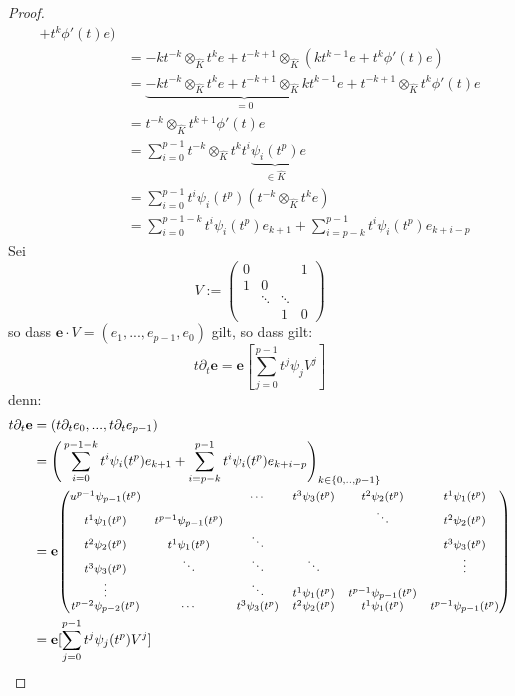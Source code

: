 \begin{proof}
\begin{align*}
    + t^k\phi'(t)e)\\
  &= -kt^{-k}\otimes_{\hat K}t^ke +
    t^{-k+1}\otimes_{\hat K}(kt^{k-1}e + t^k\phi'(t)e)\\
  &= \underset{=0}{\underbrace{-kt^{-k}\otimes_{\hat K}t^ke +
    t^{-k+1}\otimes_{\hat K}kt^{k-1}e}} +
    t^{-k+1}\otimes_{\hat K}t^k\phi'(t)e\\
  &= t^{-k}\otimes_{\hat K}t^{k+1}\phi'(t)e\\
  &= \sum_{i=0}^{p-1}t^{-k}\otimes_{\hat K}
    t^{k}t^i\underset{\in\hat K}{\underbrace{\psi_i(t^p)}}e\\
  &= \sum_{i=0}^{p-1}t^i\psi_i(t^p)(t^{-k}\otimes_{\hat K} t^{k}e)\\
  &= \sum_{i=0}^{p-1-k}t^i\psi_i(t^p)e_{k+1} +
  \sum_{i=p-k}^{p-1}t^i\psi_i(t^p)e_{k+i-p}
\end{align*}
Sei
\[
V:=\begin{pmatrix}
0 &        &          & 1\\
1 & 0\\
  & \ddots & \ddots\\
  &        & 1        & 0
\end{pmatrix}
\]
so dass $\mathbf{e}\cdot V=(e_1,...,e_{p-1},e_0)$ gilt, 
so dass gilt:
\[
t\partial_t\mathbf{e}=\mathbf{e}[\sum_{j=0}^{p-1}t^j\psi_jV^j]
\]
denn:
\begin{align*}
  t\partial_t\mathbf{e} &= (t\partial_te_0,...,t\partial_te_{p-1})\\
  &= \Bigg(\sum_{i=0}^{p-1-k}t^i\psi_i(t^p)e_{k+1} +
    \sum_{i=p-k}^{p-1}t^i\psi_i(t^p)e_{k+i-p}\Bigg)_{k\in\{0,..,p-1\}}\\
  &= \mathbf{e}
{ %
  \footnotesize
  \begin{pmatrix}u^{p-1}\psi_{p-1}(t^p) &  & \cdots & t^{3}\psi_{3}(t^p) & t^{2}
  \psi_{2}(t^p) & t^{1}\psi_{1}(t^p)\\
  t^{1}\psi_{1}(t^p) & t^{p-1}\psi_{p-1}(t^p) &  &
  & \ddots & t^{2}\psi_{2}(t^p)\\
  t^{2}\psi_{2}(t^p) & t^{1}\psi_{1}(t^p) & \ddots &  &  & t^{3}\psi_{3}(t^p)\\
  t^{3}\psi_{3}(t^p) & \ddots & \ddots & \ddots &  & \vdots\\
  \vdots &  & \ddots & t^{1}\psi_{1}(t^p) & t^{p-1}\psi_{p-1}(t^p)\\
  t^{p-2}\psi_{p-2}(t^p) & \cdots & t^{3}\psi_{3}(t^p) & t^{2}\psi_{2}(t^p) &
  t^{1}\psi_{1}(t^p) & t^{p-1}\psi_{p-1}(t^p)
  \end{pmatrix}
} \\
  &= \mathbf{e}[\sum_{j=0}^{p-1}t^j\psi_j(t^p)V^j]

\end{align*}
\end{proof}
